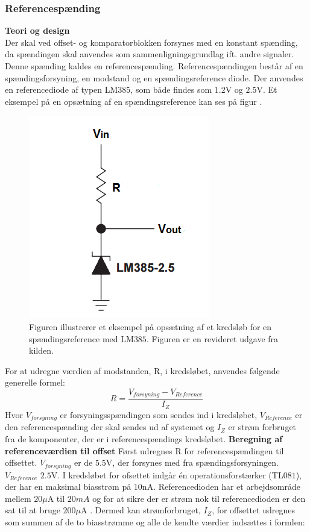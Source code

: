 \subsubsection{Referencespænding}\label{Spaendingsref}
\textbf{Teori og design}\\
Der skal ved offset- og komparatorblokken forsynes med en konstant spænding, da spændingen skal anvendes som sammenligningsgrundlag ift. andre signaler. Denne spænding kaldes en referencespænding. Referencespændingen består af en spændingsforsyning, en modstand og en spændingsreference diode. Der anvendes en referencediode af typen LM385, som både findes som $1.2$V og $2.5$V. Et eksempel på en opsætning af en spændingsreference kan ses på figur .

\begin{figure}[H]
	\centering
	\includegraphics[scale=1.0]{figures/cProblemloesning/ReferenceEksempel.PNG}
	\caption{Figuren illustrerer et eksempel på opsætning af et kredsløb for en spændingsreference med LM$385$. Figuren er en revideret udgave fra kilden. \cite{Instruments2005}}
	\label{fig:Spaendingsreference}
\end{figure}

For at udregne værdien af modstanden, R, i kredsløbet, anvendes følgende generelle formel:
\begin{equation}
R=\dfrac{V_{forsyning}-V_{Reference}}{I_{Z}}
\end{equation}
Hvor $V_{forsyning}$ er forsyningsspændingen som sendes ind i kredsløbet, $V_{Reference}$ er den referencespænding der skal sendes ud af systemet og $I_{Z}$ er strøm forbruget fra de komponenter, der er i referencespændings kredsløbet. 
\noindent \textbf{Beregning af referenceværdien til offset}
Først udregnes R for referencespændingen til offsettet. $V_{forsyning}$ er de $5.5$V, der forsynes med fra spændingsforsyningen. $V_{Reference}$ $2.5$V. I kredsløbet for ofsettet indgår én operationsforstærker (TL$081$), der har en maksimal biasstrøm på $10$nA\cite{Corporation1995}. Referencedioden har et arbejdsområde mellem $20\mu$A til $20mA$ og for at sikre der er strøm nok til referencedioden er den sat til at bruge $200\mu$A \cite{Instruments2005}. Dermed kan strømforbruget, $I_{Z}$, for offsettet udregnes som summen af de to biasstrømme og alle de kendte værdier indsættes i formlen:

